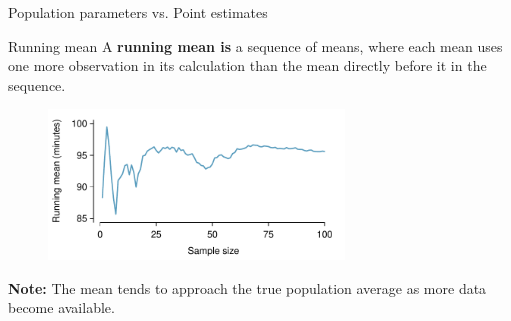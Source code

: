 \documentclass[12pt,a4paper]{beamer}
\begin{document}
\begin{frame}{Population parameters vs. Point estimates}
	\begin{table}[h]
	\centering
	\end{table}
\end{frame}
\begin{frame}{Running mean}
	A \textbf{running mean is} a sequence of means, where each mean uses one more observation in 
	its calculation than the mean directly before it in the sequence.
	\begin{figure}
	   \centering
	   \includegraphics[width=0.7\textwidth]{figures/netTimeRunningMean/netTimeRunningMean}
	\end{figure}
\small\textbf{Note:} The mean tends to approach the true population average as more data become available.
\end{frame}
\end{document}
